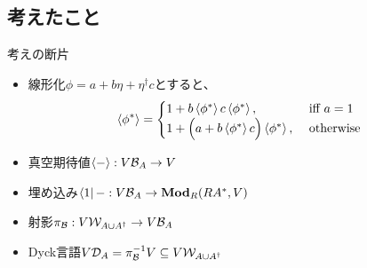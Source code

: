 {\subsection{考えたこと}\label{s2:考えたこと} %
	考えの断片
	\begin{itemize}\setlength{\itemsep}{-1mm} %
		\item 線形化$\phi=a+b\eta+\eta^\dag c$とすると、
		\begin{equation*}\begin{split}
			\mathinner{\langle{\phi^*}\rangle} = \begin{cases}
				1 + b\mathinner{\langle{\phi^*}\rangle}c\mathinner{\langle{\phi^*}\rangle}, &\text{ iff } a = 1 \\
				1 + \Bigl({a + b\mathinner{\langle{\phi^*}\rangle}c}\Bigr)\mathinner{\langle{\phi^*}\rangle}
				, &\text{ otherwise } \\
			\end{cases}
		\end{split}\end{equation*}
		\item 真空期待値$\mathinner{\langle{-}\rangle}:V{{\mathcal{B}}}_A\to V$
		\item 埋め込み$\mathinner{\langle{1}|}-:V{{\mathcal{B}}}_A\to{\ensuremath{\mathbf{{Mod}}}}_R(RA^*,V)$
		\item 射影$\pi_{{\mathcal{B}}}:V{{\mathcal{W}}}_{A\cup A^\dag}\to V{{\mathcal{B}}}_A$
		\item Dyck言語$V{{\mathcal{D}}}_A=\pi_{{\mathcal{B}}}^{-1}V\subseteq V{{\mathcal{W}}}_{A\cup A^\dag}$
	\end{itemize} %

}
